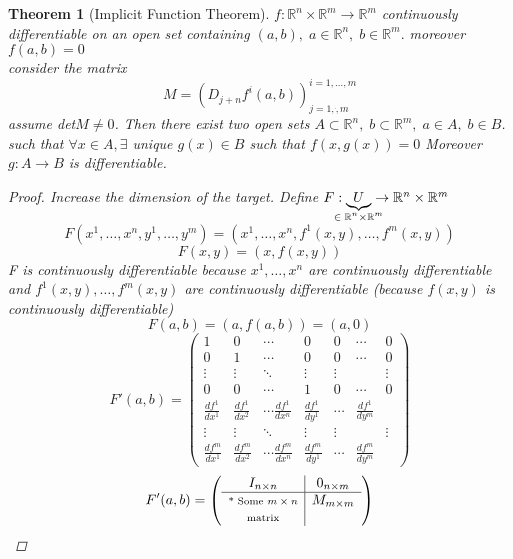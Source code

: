 \documentclass[11pt]{article}
\def\RR{\mathbb{R}}
\newtheorem{theorem}{Theorem}[section]
\begin{document}
\begin{theorem}[Implicit Function Theorem]\label{implicitFunction}
$f:\RR^n \times \RR^m \rightarrow \RR^m$ continuously differentiable on an open set containing $(a,b), \; a \in \RR^n , \; b \in \RR^m.$ moreover $f(a,b)=0$\\
consider the matrix \[M=(D_{j+n}f^{i}(a,b))^{i=1,\dots,m}_{j=1,\dot,m}\] assume det$M \neq 0$. Then there exist two open sets $A \subset \RR^n, \; b \subset \RR^m, \; a \in A, \; b \in B$. such that $\forall x \in A, \exists$ unique $g(x) \in B$ such that $f(x,g(x))=0$ Moreover $g:A \rightarrow B$ is differentiable.
\begin{proof} 
Increase the dimension of the target. Define $F:\underbrace{U}_{\mathclap{\in \;  \RR^n \times \RR^m}} \rightarrow \RR^n \times \RR^m$
\[F(x^1,\dots , x^n,y^1, \dots,y^m) = (x^1, \dots , x^n, f^1(x,y), \dots , f^m(x,y))\]
\[F(x,y) = (x,f(x,y))\]
F is continuously differentiable because $x^1 , \dots , x^n$ are continuously differentiable and $f^1(x,y), \dots , f^m(x,y)$ are continuously differentiable (because $f(x,y)$ is continuously differentiable)
\[F(a,b) = (a,f(a,b)) = (a,0)\]
\[
 F'(a,b) =
 \left( \begin{array}{cccc|ccc}
 1 & 0 & \cdots & 0 & 0 & \cdots & 0 \\
0 & 1 & \cdots & 0 & 0 & \cdots & 0 \\
  \vdots  & \vdots  & \ddots & \vdots & \vdots & & \vdots \\
0 & 0 & \cdots & 1 & 0 & \cdots & 0 \\
\hline
  \frac{df^1}{dx^1} & \frac{df^1}{dx^2}& \cdots\frac{df^1}{dx^n} & \frac{df^1}{dy^1} & \cdots & \frac{df^1}{dy^m}\\
\vdots  & \vdots  & \ddots & \vdots & \vdots & & \vdots \\
  \frac{df^m}{dx^1} & \frac{df^m}{dx^2}& \cdots\frac{df^m}{dx^n} & \frac{df^m}{dy^1} & \cdots & \frac{df^m}{dy^m}
 \end{array} \right)
\]
\[ F'(a,b) =
 \left( \begin{array}{c|c}
 I_{n \times n} & 0_{n \times m}\\
\hline
\text{\scriptsize * Some $m \times n$} & M_{m \times m}\\
\text{\scriptsize matrix} & 
 \end{array} \right) \]


\end{proof}
\end{theorem}
\end{document}

